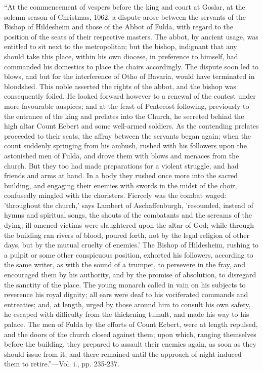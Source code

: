 ``At
the commencement of vespers before the king and court at Goslar, at
the solemn season of Christmas, 1062, a dispute arose between the
servants of the Bishop of Hildesheim and those of the Abbot of Fulda,
with regard to the position of the seats of their respective masters.
The abbot, by ancient usage, was entitled to sit next to the
metropolitan; but the bishop, indignant that any should take this
place, within his own diocese, in preference to himself, had commanded
his domestics to place the chairs accordingly. The dispute soon led to
blows, and but for the interference of Otho of Bavaria, would have
terminated in bloodshed. This noble asserted the rights of the abbot,
and the bishop was consequently foiled. He looked forward however to a
renewal of the contest under more favourable auspices; and at the
feast of Pentecost following, previously to the entrance of the king
and prelates into the Church, he secreted behind the high altar Count
Ecbert and some well-armed soldiers. As the contending prelates
proceeded to their seats, the affray between the servants began again;
when the count suddenly springing from his ambush, rushed with his
followers upon the astonished men of Fulda, and drove them with blows
and menaces from the church. But they too had made preparations for a
violent struggle, and had friends and arms at hand. In a body they
rushed once more into the sacred building, and engaging their enemies
with swords in the midst of the choir, confusedly mingled with the
choristers. Fiercely was the combat waged: 'throughout the church,'
says Lambert of Aschaffenburgh, 'resounded, instead of hymns and
spiritual songs, the shouts of the combatants and the screams of the
dying; ill-omened victims were slaughtered upon the altar of God;
while through the building ran rivers of blood, poured forth, not by
the legal religion of other days, but by the mutual cruelty of
enemies.' The Bishop of Hildesheim, rushing to a pulpit or some other
conspicuous position, exhorted his followers, according to the same
writer, as with the sound of a trumpet, to persevere in the fray, and
encouraged them by his authority, and by the promise of absolution, to
disregard the sanctity of the place. The young monarch
called in vain on his subjects to reverence his royal dignity; all
ears were deaf to his vociferated commands and entreaties; and, at
length, urged by those around him to consult his own safety, he
escaped with difficulty from the thickening tumult, and made his way
to his palace. The men of Fulda by the efforts of Count Ecbert, were
at length repulsed, and the doors of the church closed against them;
upon which, ranging themselves before the building, they prepared to
assault their enemies again, as soon as they should issue from it; and
there remained until the approach of night induced them to retire.''—Vol.
i., pp. 235-237.

